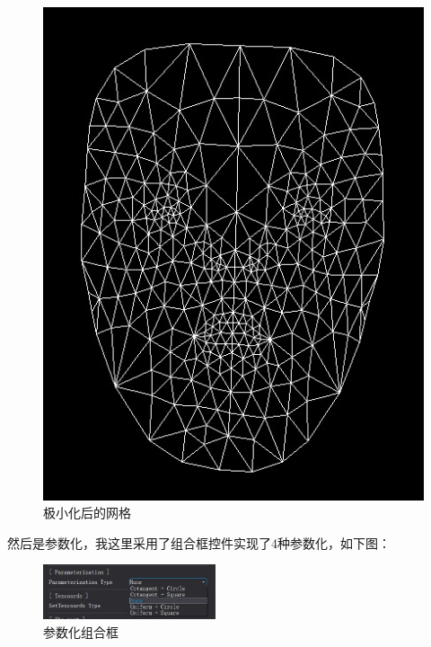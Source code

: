 \documentclass{article}
\begin{document}
\begin{figure}[htbp]
\begin{minipage}{0.49\linewidth}
			\includegraphics[width=0.9\linewidth]{mini.JPG}
			\caption{极小化后的网格}
		\end{minipage}
	\end{figure}
\clearpage
	然后是参数化，我这里采用了组合框控件实现了4种参数化，如下图：
	\begin{figure}[htb]
		\caption{参数化组合框} \centering
		\begin{center}
			\includegraphics[width=2in]{combobox.jpg}
		\end{center}
	\end{figure}
\end{document}
